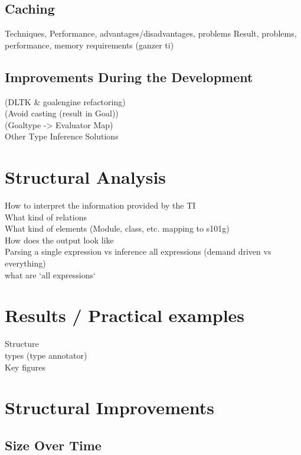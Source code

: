 \documentclass[12pt,halfparskip]{scrreprt}
\begin{document}

\section{Caching}
 Techniques, Performance, advantages/disadvantages, problems
 Result, problems, performance, memory requirements (ganzer ti)
\section{Improvements During the Development}
 (DLTK \& goalengine refactoring) \\
 (Avoid casting (result in Goal))\\
 (Goaltype -> Evaluator Map)\\
Other Type Inference Solutions\\

\chapter{Structural Analysis}
How to interpret the information provided by the TI \\
What kind of relations \\
What kind of elements (Module, class, etc. mapping to s101g) \\
How does the output look like \\
Parsing a single expression vs inference all expressions (demand driven vs everything)\\
 what are `all expressions`\\

\chapter{Results / Practical examples}
Structure \\
types (type annotator)\\
Key figures\\



\chapter{Structural Improvements}
\section{Size Over Time}
\end{document}
